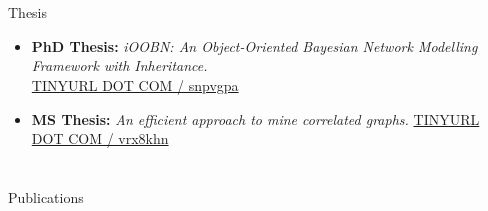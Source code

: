 \documentclass{my_cv}
\begin{document}
\section{\faBook}{Thesis}
\begin{itemize}[noitemsep]
    \item \textbf{PhD Thesis:} {\em iOOBN: An Object-Oriented Bayesian Network Modelling Framework with Inheritance.}\\ \href{https://tinyurl.com/snpvgpa}{TINYURL DOT COM / snpvgpa}
    \item \textbf{MS Thesis:} {\em An efficient approach to mine correlated graphs.} \href{https://tinyurl.com/vrx8khn}{TINYURL DOT COM / vrx8khn}
\end{itemize}

\section{\faPrint}{Publications}
\end{document}
